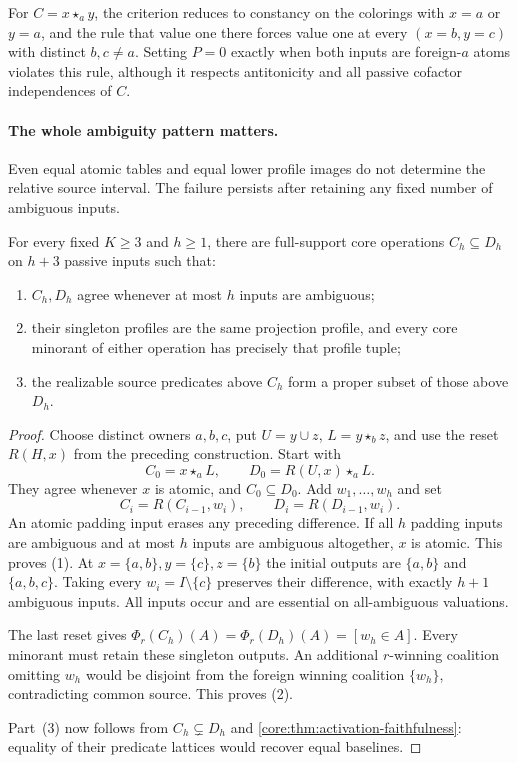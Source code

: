 For $C=x\star_a y$, the criterion reduces to constancy on the colorings
with $x=a$ or $y=a$, and the rule that value one there forces value one
at every $(x=b,y=c)$ with distinct $b,c\ne a$.
Setting $P=0$ exactly when both inputs are foreign-$a$ atoms violates
this rule, although it respects antitonicity and all passive cofactor
independences of $C$.

\paragraph{The whole ambiguity pattern matters.}
Even equal atomic tables and equal lower profile images do not determine
the relative source interval. The failure persists after retaining any
fixed number of ambiguous inputs.

\begin{proposition}
\label{core:prop:interval-ambiguity-depth}
For every fixed $K\geq3$ and $h\geq1$, there are full-support core
operations $C_h\subseteq D_h$ on $h+3$ passive inputs such that:
\begin{enumerate}
\item $C_h,D_h$ agree whenever at most $h$ inputs are ambiguous;
\item their singleton profiles are the same projection profile, and
  every core minorant of either operation has precisely that profile tuple;
\item the realizable source predicates above $C_h$ form a proper subset
  of those above $D_h$.
\end{enumerate}
\end{proposition}
\begin{proof}
Choose distinct owners $a,b,c$, put $U=y\cup z$, $L=y\star_b z$,
and use the reset $R(H,x)$ from the preceding construction. Start with
\[
 C_0=x\star_a L,\qquad D_0=R(U,x)\star_a L.
\]
They agree whenever $x$ is atomic, and $C_0\subseteq D_0$.
Add $w_1,\ldots,w_h$ and set
\[
 C_i=R(C_{i-1},w_i),\qquad D_i=R(D_{i-1},w_i).
\]
An atomic padding input erases any preceding difference.
If all $h$ padding inputs are ambiguous and at most $h$ inputs are
ambiguous altogether, $x$ is atomic. This proves (1).
At $x=\{a,b\},y=\{c\},z=\{b\}$ the initial outputs are
$\{a,b\}$ and $\{a,b,c\}$. Taking every $w_i=I\setminus\{c\}$
preserves their difference, with exactly $h+1$ ambiguous inputs.
All inputs occur and are essential on all-ambiguous valuations.

The last reset gives
$\Phi_r(C_h)(A)=\Phi_r(D_h)(A)=[w_h\in A]$.
Every minorant must retain these singleton outputs. An additional
$r$-winning coalition omitting $w_h$ would be disjoint from the
foreign winning coalition $\{w_h\}$, contradicting common source.
This proves (2).

Part~(3) now follows from $C_h\subsetneq D_h$ and
\cref{core:thm:activation-faithfulness}: equality of their predicate
lattices would recover equal baselines.
\end{proof}

